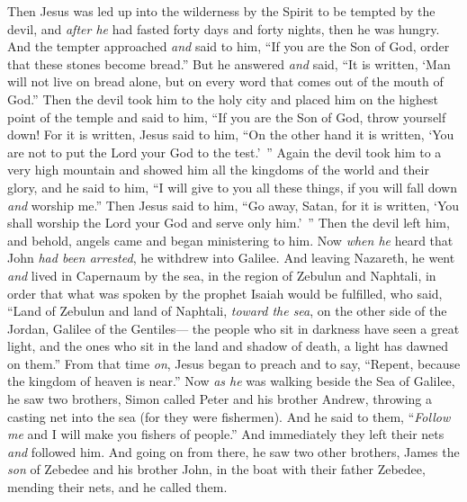 \begin{biblechapter} %
 Then Jesus was led up into the wilderness by the Spirit to be tempted by the devil,
\verse and \textit{after he} had fasted forty days and forty nights, then he was hungry.
\verse And the tempter approached \textit{and} said to him, “If you are the Son of God, order that these stones become bread.”
\verse But he answered \textit{and} said, “It is written, ‘Man will not live on bread alone, but on every word that comes out of the mouth of God.”
\verse Then the devil took him to the holy city and placed him on the highest point of the temple
\verse and said to him, “If you are the Son of God, throw yourself down! For it is written,
\verse Jesus said to him, “On the other hand it is written, ‘You are not to put the Lord your God to the test.’ ”
\verse Again the devil took him to a very high mountain and showed him all the kingdoms of the world and their glory,
\verse and he said to him, “I will give to you all these things, if you will fall down \textit{and} worship me.”
\verse Then Jesus said to him, “Go away, Satan, for it is written, ‘You shall worship the Lord your God and serve only him.’ ”
\verse Then the devil left him, and behold, angels came and began ministering to him.
 Now \textit{when he} heard that John \textit{had been arrested}, he withdrew into Galilee.
\verse And leaving Nazareth, he went \textit{and} lived in Capernaum by the sea, in the region of Zebulun and Naphtali,
\verse in order that what was spoken by the prophet Isaiah would be fulfilled, who said,
\verse “Land of Zebulun and land of Naphtali, 
\textit{toward the sea}, on the other side of the Jordan, 
Galilee of the Gentiles—
\verse the people who sit in darkness 
have seen a great light, 
and the ones who sit in the land and shadow of death, 
a light has dawned on them.”
\verse From that time \textit{on}, Jesus began to preach and to say, “Repent, because the kingdom of heaven is near.”
 Now \textit{as he} was walking beside the Sea of Galilee, he saw two brothers, Simon called Peter and his brother Andrew, throwing a casting net into the sea (for they were fishermen).
\verse And he said to them, “\textit{Follow me} and I will make you fishers of people.”
\verse And immediately they left their nets \textit{and} followed him.
\verse And going on from there, he saw two other brothers, James the \textit{son} of Zebedee and his brother John, in the boat with their father Zebedee, mending their nets, and he called them.

\end{biblechapter}
